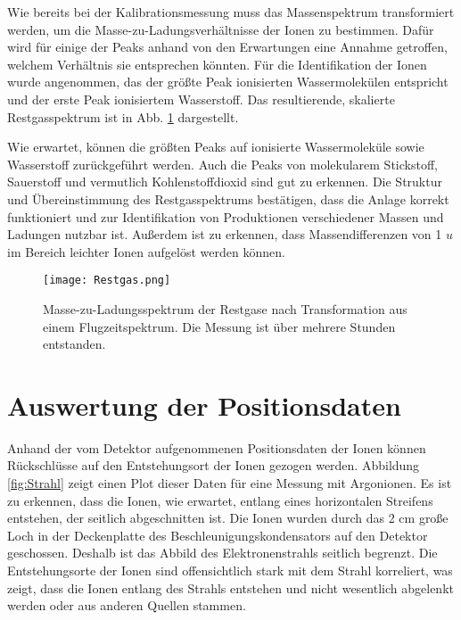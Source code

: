 Wie bereits bei der Kalibrationsmessung muss das Massenspektrum transformiert werden, um die Masse-zu-Ladungsverhältnisse der Ionen zu bestimmen. Dafür wird für einige der Peaks anhand von den Erwartungen eine Annahme getroffen, welchem Verhältnis sie entsprechen könnten. Für die Identifikation der Ionen wurde angenommen, das der größte Peak ionisierten Wassermolekülen
entspricht und der erste Peak ionisiertem Wasserstoff. Das resultierende, skalierte Restgasspektrum ist in Abb. \ref{fig:rest} dargestellt.

Wie erwartet, können die größten Peaks auf ionisierte Wassermoleküle sowie Wasserstoff zurückgeführt werden. Auch die Peaks von molekularem Stickstoff, Sauerstoff und vermutlich Kohlenstoffdioxid sind gut zu erkennen. Die Struktur und Übereinstimmung des Restgasspektrums bestätigen, dass die Anlage korrekt funktioniert und zur Identifikation von Produktionen verschiedener Massen und Ladungen nutzbar ist. Außerdem ist zu erkennen, dass Massendifferenzen von 1 $u$ im Bereich leichter Ionen aufgelöst werden können. 

\begin{figure}
    \hspace{-1.1cm}\texttt{[image: Restgas.png]}
    \caption[Masse-zu-Ladungsspektrum der Restgase]{Masse-zu-Ladungsspektrum der Restgase nach Transformation aus einem Flugzeitspektrum. Die Messung ist über mehrere Stunden entstanden.}
    \label{fig:rest}
\end{figure}

\section{Auswertung der Positionsdaten}
Anhand der vom Detektor aufgenommenen Positionsdaten der Ionen können Rückschlüsse auf den Entstehungsort der Ionen gezogen werden. Abbildung \ref{fig:Strahl} zeigt einen Plot dieser Daten für eine Messung mit Argonionen. Es ist zu erkennen, dass die Ionen, wie erwartet, entlang eines horizontalen Streifens entstehen, der seitlich abgeschnitten ist. Die Ionen wurden durch das 2 cm große Loch in der Deckenplatte des Beschleunigungskondensators auf den Detektor geschossen. Deshalb ist das Abbild des Elektronenstrahls seitlich begrenzt. Die Entstehungsorte der Ionen sind offensichtlich stark mit dem Strahl korreliert, was zeigt, dass die Ionen entlang des Strahls entstehen und nicht wesentlich abgelenkt werden oder aus anderen Quellen stammen.

